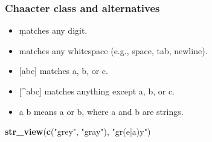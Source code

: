 \documentclass[
]{article}
\newenvironment{Shaded}{\begin{snugshade}}{\end{snugshade}}
\newcommand{\KeywordTok}[1]{\textcolor[rgb]{0.13,0.29,0.53}{\textbf{#1}}}
\newcommand{\NormalTok}[1]{#1}
\newcommand{\StringTok}[1]{\textcolor[rgb]{0.31,0.60,0.02}{#1}}
\providecommand{\tightlist}{%
  \setlength{\itemsep}{0pt}\setlength{\parskip}{0pt}}
\begin{document}
\hypertarget{htmlwidget-43566920f1a8fd5b819c}{}
\begin{str_view}

\end{str_view}

\begin{Shaded}
\end{Shaded}

\hypertarget{htmlwidget-e6e75a59f25a8eabd223}{}
\begin{str_view}

\end{str_view}

\begin{Shaded}
\end{Shaded}

\hypertarget{htmlwidget-f5af846e4c9182f75aab}{}
\begin{str_view}

\end{str_view}

\hypertarget{chaacter-class-and-alternatives}{%
\subsubsection{Chaacter class and
alternatives}\label{chaacter-class-and-alternatives}}

\begin{itemize}
\tightlist
\item
  \d matches any digit.
\item
  \s matches any whitespace (e.g., space, tab, newline).
\item
  {[}abc{]} matches a, b, or c.
\item
  {[}\^{}abc{]} matches anything except a, b, or c.
\item
  a \textbar{} b means a or b, where a and b are strings.
\end{itemize}

\begin{Shaded}
\begin{Highlighting}[]
\KeywordTok{str\_view}\NormalTok{(}\KeywordTok{c}\NormalTok{(}\StringTok{"grey"}\NormalTok{, }\StringTok{"gray"}\NormalTok{), }\StringTok{"gr(e|a)y"}\NormalTok{)}
\end{Highlighting}
\end{Shaded}
\end{document}
